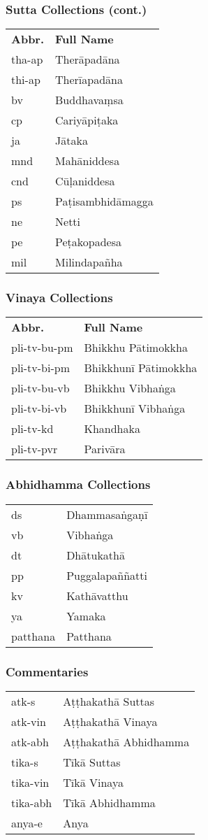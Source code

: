 \normalsize
\subsubsection{Sutta Collections (cont.)}

\small
\begin{tabular}{ l l }
\textbf{Abbr.} & \textbf{Full Name} \\
tha-ap & Therāpadāna \\
thi-ap & Therīapadāna \\
bv & Buddhavaṃsa \\
cp & Cariyāpiṭaka \\
ja & Jātaka \\
mnd & Mahāniddesa \\
cnd & Cūḷaniddesa \\
ps & Paṭisambhidāmagga \\
ne & Netti \\
pe & Peṭakopadesa \\
mil & Milindapañha
\end{tabular}

\normalsize
\subsubsection{Vinaya Collections}

\small
\begin{tabular}{ l l }
\textbf{Abbr.} & \textbf{Full Name} \\
pli-tv-bu-pm & Bhikkhu Pātimokkha \\
pli-tv-bi-pm & Bhikkhunī Pātimokkha \\
pli-tv-bu-vb & Bhikkhu Vibhaṅga \\
pli-tv-bi-vb & Bhikkhunī Vibhaṅga \\
pli-tv-kd & Khandhaka \\
pli-tv-pvr & Parivāra
\end{tabular}

\normalsize
\subsubsection{Abhidhamma Collections}

\small
\begin{tabular}{ l l }
ds & Dhammasaṅgaṇī \\
vb & Vibhaṅga \\
dt & Dhātukathā \\
pp & Puggalapaññatti \\
kv & Kathāvatthu \\
ya & Yamaka \\
patthana & Patthana
\end{tabular}

\normalsize
\subsubsection{Commentaries}

\small
\begin{tabular}{ l l }
atk-s & Aṭṭhakathā Suttas \\
atk-vin & Aṭṭhakathā Vinaya \\
atk-abh & Aṭṭhakathā Abhidhamma \\
tika-s & Tīkā Suttas \\
tika-vin & Tīkā Vinaya \\
tika-abh & Tīkā Abhidhamma \\
anya-e & Anya
\end{tabular}

\normalsize

